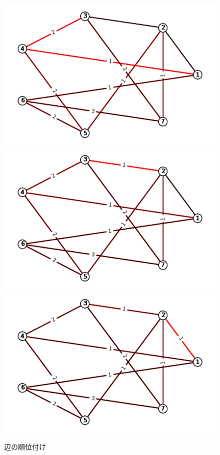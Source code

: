 \documentclass{report}
\begin{document}
\begin{CJK}{UTF8}{min}
\begin{figure}
        \includegraphics[width=.49\textwidth]{data/ex-8-F-4.png}
        \\[\smallskipamount]
        \includegraphics[width=.49\textwidth]{data/ex-8-F-5.png}\hfill
        \includegraphics[width=.49\textwidth]{data/ex-8-F-6.png}
        \caption{辺の順位付け}
    \end{figure}

\end{CJK}
\end{document}
